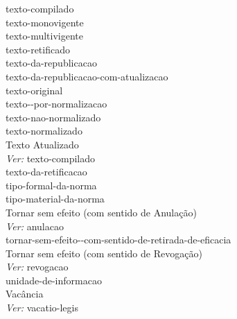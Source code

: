  \hspace*{3.0cm}\glosshsep \Gls{texto-compilado} \\ 
 \hspace*{4.0cm}\glosshsep \Gls{texto-monovigente} \\ 
 \hspace*{4.0cm}\glosshsep \Gls{texto-multivigente} \\ 
 \hspace*{4.0cm}\glosshsep \Gls{texto-retificado} \\ 
 \hspace*{3.0cm}\glosshsep \Gls{texto-da-republicacao} \\ 
 \hspace*{3.0cm}\glosshsep \Gls{texto-da-republicacao-com-atualizacao} \\ 
 \hspace*{2.0cm}\glosshsep \Gls{texto-original} \\ 
 \hspace*{1.0cm}\glosshsepclass \Gls{texto--por-normalizacao} \\ 
 \hspace*{2.0cm}\glosshsep \Gls{texto-nao-normalizado} \\ 
 \hspace*{2.0cm}\glosshsep \Gls{texto-normalizado} \\ 
Texto Atualizado \\ 
 \hspace*{1.0cm}\glosshsep \textit{Ver:} \Gls{texto-compilado} \\ 
\Gls{texto-da-retificacao} \\ 
\Gls{tipo-formal-da-norma} \\ 
\Gls{tipo-material-da-norma} \\ 
Tornar sem efeito (com sentido de Anulação) \\ 
 \hspace*{1.0cm}\glosshsep \textit{Ver:} \Gls{anulacao} \\ 
\Gls{tornar-sem-efeito--com-sentido-de-retirada-de-eficacia} \\ 
Tornar sem efeito (com sentido de Revogação) \\ 
 \hspace*{1.0cm}\glosshsep \textit{Ver:} \Gls{revogacao} \\ 
\Gls{unidade-de-informacao} \\ 
Vacância \\ 
 \hspace*{1.0cm}\glosshsep \textit{Ver:} \Gls{vacatio-legis} \\ 
